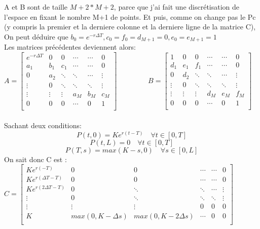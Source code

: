 \documentclass[a4paper, 12pt]{article}
\begin{document}
A et B sont de taille $M+2* M+2$, parce que j'ai fait une discrétisation de l'espace en fixant le nombre M+1 de points. Et puis, comme on change pas le Pc (y compris la premier et la derniere colonne et la derniere ligne de la matrice C), On peut déduire que $b_0 = e^{-r\Delta T} , c_0 = f_0 = d_{M+1}=0 , e_0 =e_{M+1} = 1 $ \\ 

Les matrices précédentes deviennent alors:\\


 $A = \left[
\begin{matrix}
 e^{-r\Delta T}      & 0     & 0      & \cdots & \cdots & 0      \\
 a_1      & b_1      & c_1     & \cdots & \cdots & 0      \\
 0      & a_2     & \ddots      & \ddots & \cdots & \vdots      \\
 \vdots      & 0      & \ddots      & \ddots & \ddots & \vdots     \\
 \vdots      & \vdots      & \vdots       & a_M & b_M & c_{M}        \\
 0      & 0      & 0      & \cdots & 0 & 1     \\
\end{matrix}
\right]$ $\quad$ $\quad$ $\quad$
$B = \left[
\begin{matrix}
 1     & 0     & 0      & \cdots & \cdots & 0      \\
 d_1      & e_1      & f_1      & \cdots & \cdots & 0      \\
 0      & d_2      & \ddots      & \ddots & \cdots & \vdots      \\
 \vdots      & 0      & \ddots      & \ddots & \ddots & \vdots     \\
 \vdots      & \vdots      & \vdots      & d_M & e_M & f_{M}        \\
 0      & 0      & 0      & \cdots & 0 & 1     \\
\end{matrix}
\right]$\\\\

{Sachant deux conditions:}
\[P(t,0) = Ke^{r(t-T)}\quad  \forall t \in [0,T]\]
\[P(t,L) = 0\quad  \forall t \in [0,T]\]
\[P(T,s) = max(K - s, 0)\quad  \forall s \in [0,L]\]
On sait donc  C est :\\

$C = \left[
\begin{matrix}
 Ke^{r(-T)}      & 0     & 0      & \cdots & \cdots & 0      \\
 Ke^{r(\Delta T-T)}      & 0      & 0    & \cdots & \cdots & 0      \\
  Ke^{r(2\Delta T-T)}     & 0     & \ddots      & \ddots & \cdots & \vdots      \\
 \vdots      & 0      & \ddots      & \ddots & \ddots & \vdots     \\
 \vdots      & \vdots      & \vdots       & 0 & 0 & 0        \\
 K      & max(0,K-\Delta s)      & max(0,K-2\Delta s)        & \cdots & 0 & 0     \\
\end{matrix}
\right]$\\\\
\end{document}
